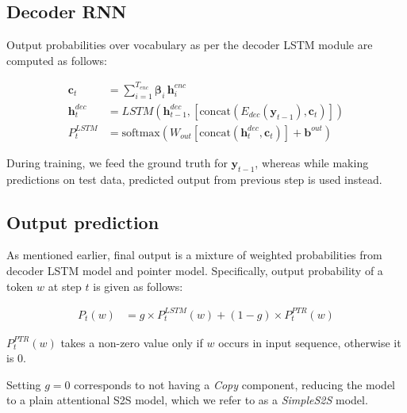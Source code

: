\subsection{Decoder RNN}

Output probabilities over vocabulary as per the decoder LSTM module are computed as follows:

\begin{center}
\footnotesize
\begin{align*}
\mathbf{c}_t &= \sum_{i=1}^{T_{enc}} \boldsymbol{\beta}_i \, \mathbf{h}^{enc}_i  \\
\mathbf{h}^{dec}_{t} &= LSTM(\mathbf{h}^{dec}_{t-1},[\text{concat}({E_{dec}}({\mathbf{y}_{t-1}}),\mathbf{c}_{t})])  \\
P_{t}^{LSTM} &=\text{softmax}(W_{out}[\text{concat}(\mathbf{h}^{dec}_{t}, \mathbf{c}_{t})] + \mathbf{b}^{out}) 
\end{align*}
\normalsize
\end{center}
During training, we feed the ground truth for $\mathbf{y}_{t-1}$, whereas while making predictions on test data, predicted output from previous step is used instead.

\subsection{Output prediction}
As mentioned earlier, final output is a mixture of weighted probabilities from decoder LSTM model and pointer model.  Specifically, output probability of a token $w$ at step $t$ is given as follows:
\begin{center}
\footnotesize
\begin{align*}
P_{t}(w) &= g \times P_{t}^{LSTM}(w) + (1-g) \times P_{t}^{PTR}(w) 
\end{align*}
\normalsize
\end{center}
$P_{t}^{PTR}(w)$ takes a non-zero value only if $w$ occurs in input sequence, otherwise it is $0$.

Setting $g=0$ corresponds to not having a \textit{Copy} component, reducing the model to a plain attentional S2S model, which we refer to as a \textit{SimpleS2S} model. 
%
%
%
%


